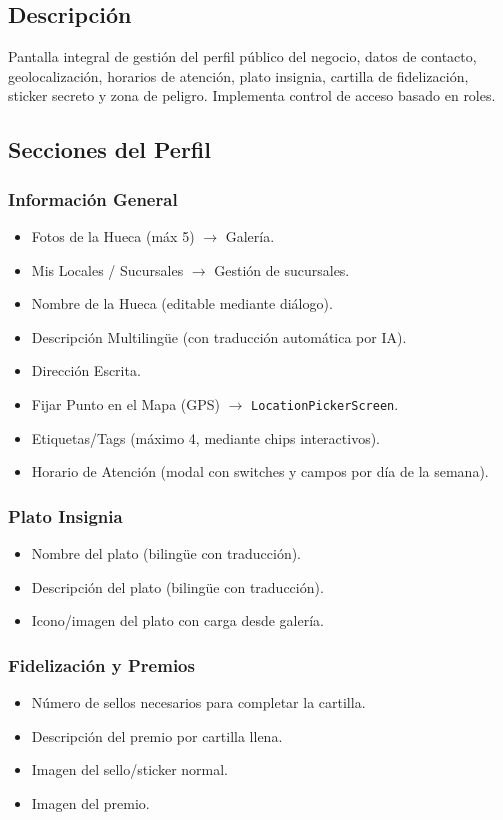 \documentclass[11pt, a4paper, oneside]{report}
\begin{document}
\subsection{Descripción}
Pantalla integral de gestión del perfil público del negocio, datos de contacto, geolocalización, horarios de atención, plato insignia, cartilla de fidelización, sticker secreto y zona de peligro. Implementa control de acceso basado en roles.

\subsection{Secciones del Perfil}

\subsubsection{Información General}
\begin{itemize}
  \item Fotos de la Hueca (máx 5) $\rightarrow$ Galería.
  \item Mis Locales / Sucursales $\rightarrow$ Gestión de sucursales.
  \item Nombre de la Hueca (editable mediante diálogo).
  \item Descripción Multilingüe (con traducción automática por IA).
  \item Dirección Escrita.
  \item Fijar Punto en el Mapa (GPS) $\rightarrow$ \texttt{LocationPickerScreen}.
  \item Etiquetas/Tags (máximo 4, mediante chips interactivos).
  \item Horario de Atención (modal con switches y campos por día de la semana).
\end{itemize}

\subsubsection{Plato Insignia}
\begin{itemize}
  \item Nombre del plato (bilingüe con traducción).
  \item Descripción del plato (bilingüe con traducción).
  \item Icono/imagen del plato con carga desde galería.
\end{itemize}

\subsubsection{Fidelización y Premios}
\begin{itemize}
  \item Número de sellos necesarios para completar la cartilla.
  \item Descripción del premio por cartilla llena.
  \item Imagen del sello/sticker normal.
  \item Imagen del premio.
\end{itemize}
\end{document}
